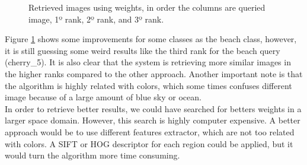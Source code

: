\documentclass[12pt,a4paper]{article}
\begin{document}
\begin{figure}[!h]
{{		}
	}
	\enskip
	{
		{
			\setlength{\fboxsep}{1pt}
			\setlength{\fboxrule}{1pt}
		}
	}


	\caption{Retrieved images using weights, in order the columns are queried image, 1º rank, 2º rank, and 3º rank.}
	\label{fig:complexAvr}
\end{figure}

Figure \ref{fig:complexAvr} shows some improvements for some classes as the beach class, however, it is still guessing some weird results like the third rank for the beach query (cherry\_5). It is also clear that the system is retrieving more similar images in the higher ranks compared to the other approach. Another important note is that the algorithm is highly related with colors, which some times confuses different image because of a large amount of blue sky or ocean. \\

In order to retrieve better results, we could have searched for betters weights in a larger space domain. However, this search is highly computer expensive. A better approach would be to use different features extractor, which are not too related with colors. A SIFT or HOG descriptor for each region could be applied, but it would turn the algorithm more time consuming.
\end{document}
